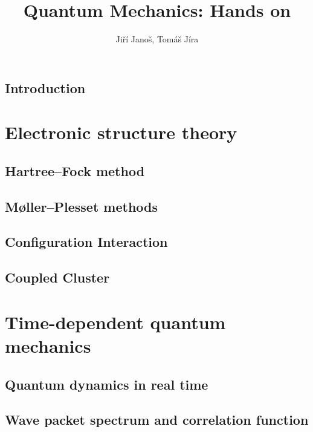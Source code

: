 \documentclass[paper=b5,parskip=half,open=any,headsepline=true,11pt]{scrbook}
\title{Quantum Mechanics: Hands on}
\author{Jiří Janoš, Tomáš Jíra}
\begin{document}
\frontmatter
\pagestyle{scrheadings}



\tableofcontents

\chapter{Introduction}
\label{kap:uvod}


\mainmatter

\part{Electronic structure theory}

\chapter{Hartree--Fock method}
\label{kap:hf}


\chapter{Møller--Plesset methods}
\label{kap:mp}


\chapter{Configuration Interaction}
\label{kap:ci}


\chapter{Coupled Cluster}
\label{kap:cc}


\part{Time-dependent quantum mechanics}

\chapter{Quantum dynamics in real time}
\label{kap:qd}


\chapter{Wave packet spectrum and correlation function}
\label{kap:spec}
% 
\end{document}

